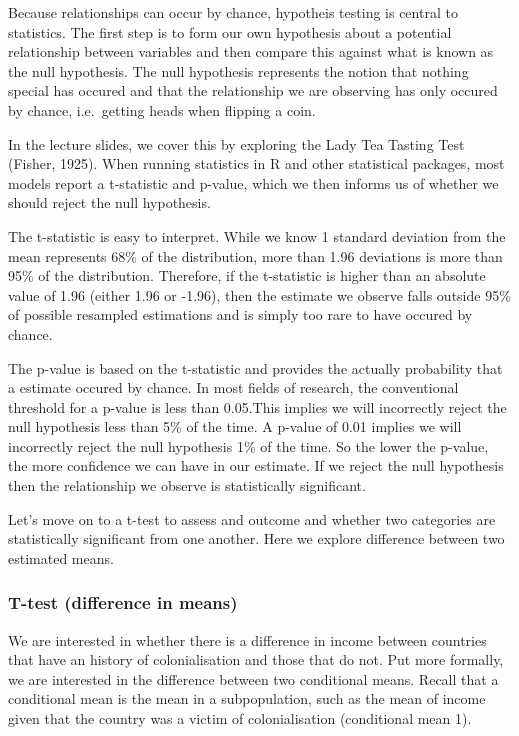 \documentclass[]{article}
\begin{document}
Because relationships can occur by chance, hypotheis testing is central to statistics. The first step is to form our own hypothesis about a potential relationship between variables and then compare this against what is known as the null hypothesis. The null hypothesis represents the notion that nothing special has occured and that the relationship we are observing has only occured by chance, i.e.~getting heads when flipping a coin.

In the lecture slides, we cover this by exploring the Lady Tea Tasting Test (Fisher, 1925). When running statistics in R and other statistical packages, most models report a t-statistic and p-value, which we then informs us of whether we should reject the null hypothesis.

The t-statistic is easy to interpret. While we know 1 standard deviation from the mean represents 68\% of the distribution, more than 1.96 deviations is more than 95\% of the distribution. Therefore, if the t-statistic is higher than an absolute value of 1.96 (either 1.96 or -1.96), then the estimate we observe falls outside 95\% of possible resampled estimations and is simply too rare to have occured by chance.

The p-value is based on the t-statistic and provides the actually probability that a estimate occured by chance.
In most fields of research, the conventional threshold for a p-value is less than 0.05.This implies we will incorrectly reject the null hypothesis less than 5\% of the time.
A p-value of 0.01 implies we will incorrectly reject the null hypothesis 1\% of the time. So the lower the p-value, the more confidence we can have in our estimate.
If we reject the null hypothesis then the relationship we observe is statistically significant.

Let's move on to a t-test to assess and outcome and whether two categories are statistically significant from one another. Here we explore difference between two estimated means.

\hypertarget{t-test-difference-in-means}{%
\subsubsection{T-test (difference in means)}\label{t-test-difference-in-means}}

We are interested in whether there is a difference in income between countries that have an history of colonialisation and those that do not. Put more formally, we are interested in the difference between two conditional means. Recall that a conditional mean is the mean in a subpopulation, such as the mean of income given that the country was a victim of colonialisation (conditional mean 1).
\end{document}
